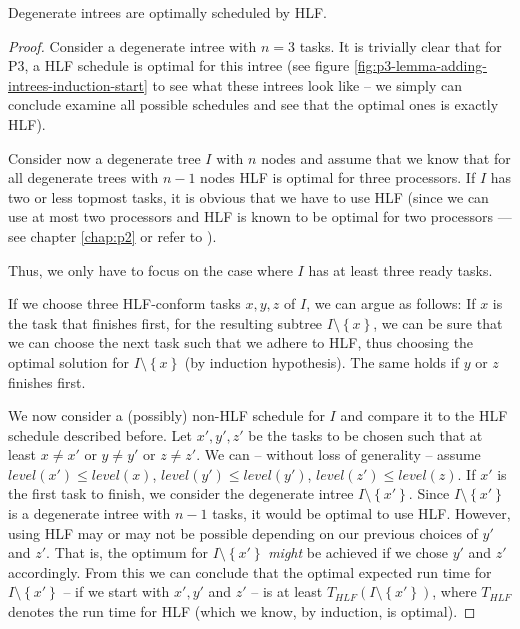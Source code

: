 \begin{theorem}
  Degenerate intrees are optimally scheduled by HLF.
\end{theorem}

\begin{proof}
  Consider a degenerate intree with $n=3$ tasks. It is trivially clear that for P3, a HLF schedule is optimal for this intree (see figure \ref{fig:p3-lemma-adding-intrees-induction-start} to see what these intrees look like -- we simply can conclude examine all possible schedules and see that the optimal ones is exactly HLF).
  
  Consider now a degenerate tree $I$ with $n$ nodes and assume that we know that for all degenerate trees with $n-1$ nodes HLF is optimal for three processors. If $I$ has two or less topmost tasks, it is obvious that we have to use HLF (since we can use at most two processors and HLF is known to be optimal for two processors --- see chapter \ref{chap:p2} or refer to \cite{chandyreynoldsshortpaper1975}).

  Thus, we only have to focus on the case where $I$ has at least three ready tasks.

  If we choose three HLF-conform tasks $x,y,z$ of $I$, we can argue as follows: If $x$ is the task that finishes first, for the resulting subtree $I\setminus \left\{ x \right\}$, we can be sure that we can choose the next task such that we adhere to HLF, thus choosing the optimal solution for $I\setminus\left\{ x \right\}$ (by induction hypothesis). The same holds if $y$ or $z$ finishes first.
  
  We now consider a (possibly) non-HLF schedule for $I$ and compare it to the HLF schedule described before.
  Let $x',y',z'$ be the tasks to be chosen such that at least $x\neq x'$ or $y\neq y'$ or $z\neq z'$. We can -- without loss of generality -- assume $level(x')\leq level(x)$, $level(y')\leq level(y')$, $level(z')\leq level(z)$. If $x'$ is the first task to finish, we consider the degenerate intree $I\setminus\left\{ x' \right\}$. Since $I \setminus \left\{ x' \right\}$ is a degenerate intree with $n-1$ tasks, it would be optimal to use HLF. However, using HLF may or may not be possible depending on our previous choices of $y'$ and $z'$. That is, the optimum for $I\setminus\left\{ x' \right\}$ \emph{might} be achieved if we chose $y'$ and $z'$ accordingly. From this we can conclude that the optimal expected run time for $I\setminus\left\{ x' \right\}$ -- if we start with $x',y'$ and $z'$ -- is at least $T_{HLF}\left( I\setminus\left\{ x' \right\} \right)$, where $T_{HLF}$ denotes the run time for HLF (which we know, by induction, is optimal).


\end{proof}
